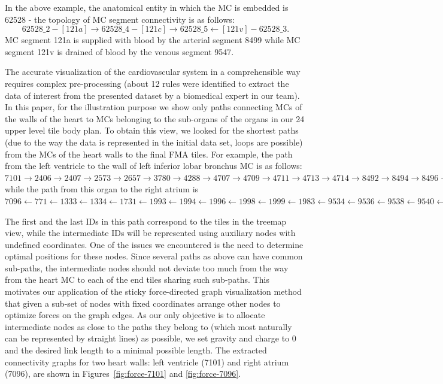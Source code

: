 In the above example, the anatomical entity in which the MC is embedded is 62528 - the topology of MC segment connectivity is as follows:
$$62528\_2 - [121a] \rightarrow 62528\_4 - [121c] \rightarrow 62528\_5 \leftarrow [121v] - 62528\_3.$$
MC segment 121a is supplied with blood by the arterial segment 8499 while MC segment 121v is drained of blood by the venous segment 9547.

The accurate visualization of the cardiovascular system in a comprehensible way requires complex pre-processing (about 12 rules were identified to extract the data of interest from the presented dataset by a biomedical expert in our team).
In this paper, for the illustration purpose we show only paths connecting MCs of the walls of the heart to MCs belonging to the sub-organs of the organs in our 24 upper level tile body plan.
To obtain this view, we looked for the shortest paths (due to the way the data is represented in the initial data set, loops are possible) from the MCs of the heart walls to the final FMA tiles. For example, the path from the left ventricle to the wall of left inferior lobar bronchus MC is as follows:
{\scriptsize $7101 \rightarrow 2406 \rightarrow 2407 \rightarrow 2573 \rightarrow 2657 \rightarrow 3780 \rightarrow 4288 \rightarrow 4707 \rightarrow 4709 \rightarrow 4711 \rightarrow 4713 \rightarrow 4714 \rightarrow 8492 \rightarrow 8494 \rightarrow 8496 \rightarrow 8498 \rightarrow 8499 \rightarrow 62528,$}
while the path from this organ to the right atrium is
{\scriptsize $7096 \leftarrow 771 \leftarrow 1333 \leftarrow 1334 \leftarrow 1731 \leftarrow 1993 \leftarrow 1994 \leftarrow 1996 \leftarrow 1998 \leftarrow 1999 \leftarrow 1983 \leftarrow 9534 \leftarrow 9536 \leftarrow 9538 \leftarrow 9540 \leftarrow 9542 \leftarrow 9544 \leftarrow 9546 \leftarrow 9547 \leftarrow 62528.$}

The first and the last IDs in this path correspond to the tiles in the treemap view, while the intermediate IDs will be represented using auxiliary nodes with undefined coordinates. One of the issues we encountered is the need to determine optimal positions for these nodes. Since several paths as above can have common sub-paths, the intermediate nodes should not deviate too much from the way from the heart MC to each of the end tiles sharing such sub-paths. This motivates our application of the sticky force-directed graph visualization method~\cite{FR91}\cite{Bos14} that given a sub-set of nodes with fixed coordinates arrange other nodes to optimize forces on the graph edges. As our only objective is to allocate intermediate nodes as close to the paths they belong to (which most naturally can be represented by straight lines) as possible, we set gravity and charge to 0 and the desired link length to a minimal possible length. The extracted connectivity graphs for two heart walls: left ventricle (7101) and right atrium (7096), are shown in Figures~\ref{fig:force-7101} and \ref{fig:force-7096}.

